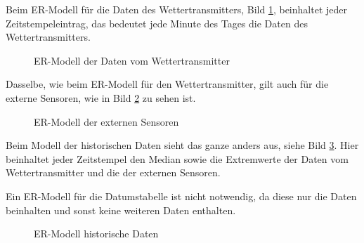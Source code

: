 Beim ER-Modell für die Daten des Wettertransmitters, Bild \ref{img:ER_Modell Wettertransmitter},  beinhaltet jeder Zeitstempeleintrag, das bedeutet jede Minute des Tages die Daten des Wettertransmitters. 

\begin{figure}[h!]
	\centering
	\caption{ER-Modell der Daten vom Wettertransmitter}
	\label{img:ER_Modell Wettertransmitter}
\end{figure}

Dasselbe, wie beim ER-Modell für den Wettertransmitter, gilt auch für die externe Sensoren, wie in Bild \ref{img:ER_Modell externe Sensoren} zu sehen ist. 
\begin{figure}[h!]
	\centering
	\caption{ER-Modell der externen Sensoren}
	\label{img:ER_Modell externe Sensoren}
\end{figure}

Beim Modell der historischen Daten sieht das ganze anders aus, siehe Bild \ref{img:ER_Modell historische Daten}. Hier beinhaltet jeder Zeitstempel den Median sowie die Extremwerte der Daten vom Wettertransmitter und die der externen Sensoren.

Ein ER-Modell für die Datumstabelle ist nicht notwendig, da diese nur die Daten beinhalten und sonst keine weiteren Daten enthalten.

\begin{figure}[h!]
	\centering
	\caption{ER-Modell historische Daten}
	\label{img:ER_Modell historische Daten}
\end{figure}

